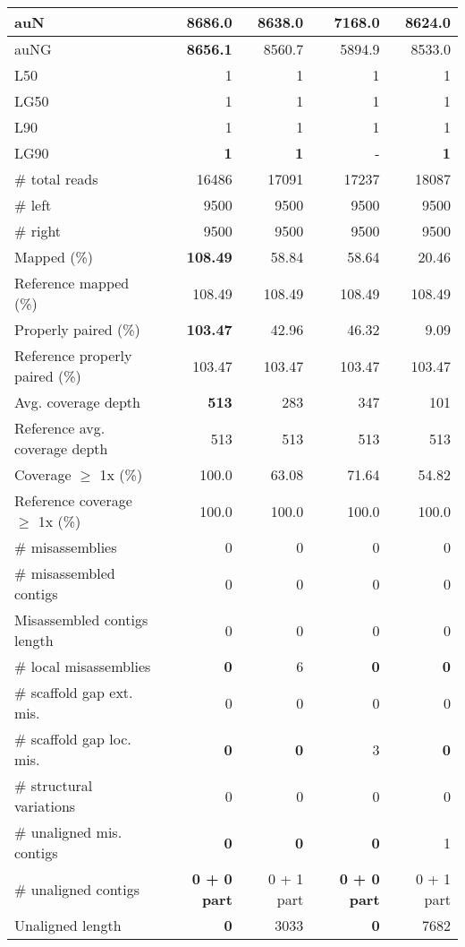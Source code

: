 \documentclass[12pt,a4paper]{article}
\begin{document}
\begin{table}[ht]
\begin{center}
\begin{tabular}{|l*{4}{|r}|}
auN & {\bf 8686.0} & 8638.0 & 7168.0 & 8624.0 \\ \hline
auNG & {\bf 8656.1} & 8560.7 & 5894.9 & 8533.0 \\ \hline
L50 & 1 & 1 & 1 & 1 \\ \hline
LG50 & 1 & 1 & 1 & 1 \\ \hline
L90 & 1 & 1 & 1 & 1 \\ \hline
LG90 & {\bf 1} & {\bf 1} & - & {\bf 1} \\ \hline
\# total reads & 16486 & 17091 & 17237 & 18087 \\ \hline
\# left & 9500 & 9500 & 9500 & 9500 \\ \hline
\# right & 9500 & 9500 & 9500 & 9500 \\ \hline
Mapped (\%) & {\bf 108.49} & 58.84 & 58.64 & 20.46 \\ \hline
Reference mapped (\%) & 108.49 & 108.49 & 108.49 & 108.49 \\ \hline
Properly paired (\%) & {\bf 103.47} & 42.96 & 46.32 & 9.09 \\ \hline
Reference properly paired (\%) & 103.47 & 103.47 & 103.47 & 103.47 \\ \hline
Avg. coverage depth & {\bf 513} & 283 & 347 & 101 \\ \hline
Reference avg. coverage depth & 513 & 513 & 513 & 513 \\ \hline
Coverage $\geq$ 1x (\%) & 100.0 & 63.08 & 71.64 & 54.82 \\ \hline
Reference coverage $\geq$ 1x (\%) & 100.0 & 100.0 & 100.0 & 100.0 \\ \hline
\# misassemblies & 0 & 0 & 0 & 0 \\ \hline
\# misassembled contigs & 0 & 0 & 0 & 0 \\ \hline
Misassembled contigs length & 0 & 0 & 0 & 0 \\ \hline
\# local misassemblies & {\bf 0} & 6 & {\bf 0} & {\bf 0} \\ \hline
\# scaffold gap ext. mis. & 0 & 0 & 0 & 0 \\ \hline
\# scaffold gap loc. mis. & {\bf 0} & {\bf 0} & 3 & {\bf 0} \\ \hline
\# structural variations & 0 & 0 & 0 & 0 \\ \hline
\# unaligned mis. contigs & {\bf 0} & {\bf 0} & {\bf 0} & 1 \\ \hline
\# unaligned contigs & {\bf 0 + 0 part} & 0 + 1 part & {\bf 0 + 0 part} & 0 + 1 part \\ \hline
Unaligned length & {\bf 0} & 3033 & {\bf 0} & 7682 \\ \hline

\end{tabular}
\end{center}
\end{table}
\end{document}

